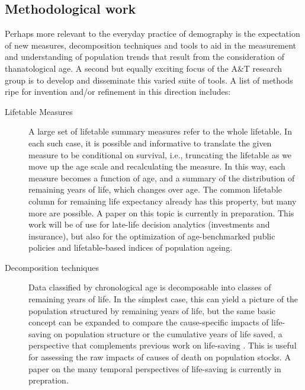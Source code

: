 \documentclass[a4paper,12pt]{article}
\begin{document}
\subsection{Methodological work}
Perhaps more relevant to the everyday practice of demography is the expectation
of new measures, decomposition techniques and tools to aid in the measurement
and understanding of population trends that result from the consideration of
thanatological age. A second but equally exciting focus of the A\&T research
group is to develop and disseminate this varied suite of tools. A list of
methods ripe for invention and/or refinement in this direction includes:

\begin{description}
\item[Lifetable Measures]{A large set of lifetable summary measures refer to
the whole lifetable. In each such case, it is possible and
informative to translate the given measure to be conditional on survival, i.e.,
truncating the lifetable as we move up the age scale and recalculating the
measure. In this way, each measure becomes a function of age, and a summary of
the distribution of remaining years of life, which changes over age. The common
lifetable column for remaining life expectancy already has this property, but
many more are possible. A paper on this topic is currently in preparation.
This work will be of use for late-life decision analytics (investments and
insurance), but also for the optimization of age-benchmarked public policies
and lifetable-based indices of population ageing.}
\item[Decomposition techniques]{Data classified by chronological age is
decomposable into classes of remaining years of life. In the simplest case,
this can yield a picture of the population structured by remaining years of life, but
the same basic concept can be expanded to compare the cause-specific impacts of
life-saving on population structure or the cumulative
years of life saved, a perspective that complements previous work on life-saving
\cite{vaupel1987repeated,vaupel2008lifesaving}. This is useful for
assessing the raw impacts of causes of death on population stocks. A paper on the many temporal perspectives of life-saving is currently in prepration.}
\end{description}
\end{document}
